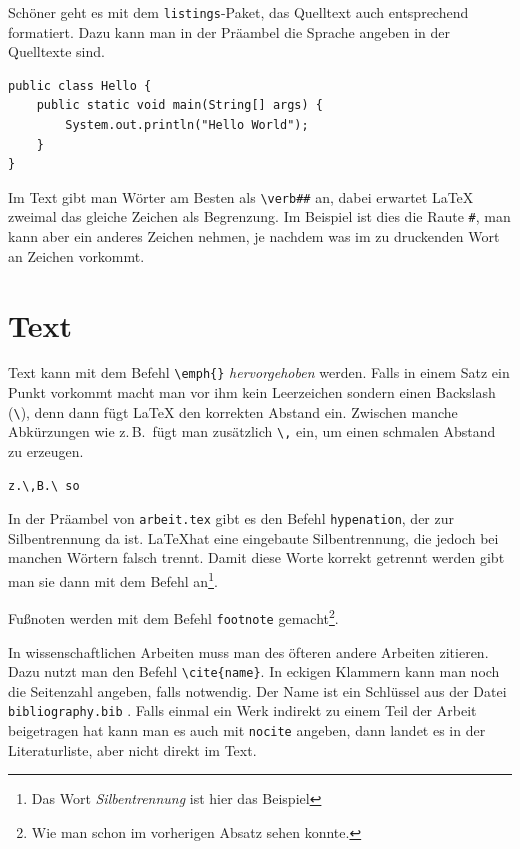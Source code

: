 Schöner geht es mit dem \verb|listings|-Paket, das Quelltext auch entsprechend formatiert. Dazu kann man in der Präambel die Sprache angeben in der Quelltexte sind.

\begin{lstlisting}
public class Hello {
    public static void main(String[] args) {
        System.out.println("Hello World");
    }
}
\end{lstlisting}

Im Text gibt man Wörter am Besten als \verb|\verb##| an, dabei erwartet \LaTeX{} zweimal das gleiche Zeichen als Begrenzung. Im Beispiel ist dies die Raute \verb|#|, man kann aber ein anderes Zeichen nehmen, je nachdem was im zu druckenden Wort an Zeichen vorkommt.



\section{Text}

Text kann mit dem Befehl \verb|\emph{}| \emph{hervorgehoben} werden. Falls in einem Satz ein Punkt vorkommt macht man vor ihm kein Leerzeichen sondern einen Backslash (\verb|\|), denn dann fügt \LaTeX{} den korrekten Abstand ein. Zwischen manche Abkürzungen wie z.\,B.\ fügt man zusätzlich \verb|\,| ein, um einen schmalen Abstand zu erzeugen.

\begin{verbatim}
z.\,B.\ so
\end{verbatim}

In der Präambel von \verb|arbeit.tex| gibt es den Befehl \verb|hypenation|, der zur Silbentrennung da ist. \LaTeX hat eine eingebaute Silbentrennung, die jedoch bei manchen Wörtern falsch trennt. Damit diese Worte korrekt getrennt werden gibt man sie dann mit dem Befehl an\footnote{Das Wort \emph{Silbentrennung} ist hier das Beispiel}.

Fußnoten werden mit dem Befehl \verb|footnote| gemacht\footnote{Wie man schon im vorherigen Absatz sehen konnte.}.

In wissenschaftlichen Arbeiten muss man des öfteren andere Arbeiten zitieren. Dazu nutzt man den Befehl \verb|\cite{name}|. In eckigen Klammern kann man noch die Seitenzahl angeben, falls notwendig. Der Name ist ein Schlüssel aus der Datei \verb|bibliography.bib| \cite[S.\ 10]{kopka}. Falls einmal ein Werk indirekt zu einem Teil der Arbeit beigetragen hat kann man es auch mit \verb|nocite| angeben, dann landet es in der Literaturliste, aber nicht direkt im Text.


